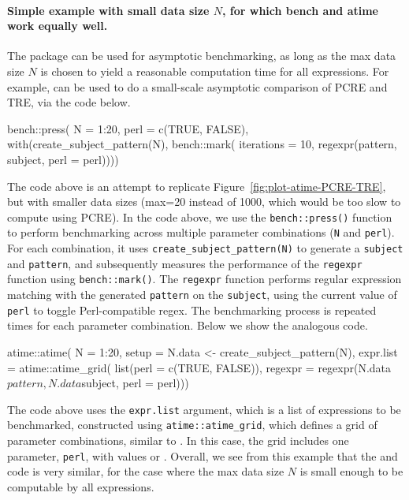 \paragraph{Simple example with small data size $N$, for which bench and atime work equally well.}
The  package can be used for asymptotic benchmarking, as long as the max data size $N$ is chosen to yield a reasonable computation time for all expressions.
For example,  can be used to do a small-scale asymptotic comparison of PCRE and TRE, via the code below. 
\begin{Schunk}
\begin{Sinput}
bench::press(
  N = 1:20,
  perl = c(TRUE, FALSE),
  with(create_subject_pattern(N), bench::mark(
    iterations = 10,
    regexpr(pattern, subject, perl = perl))))
\end{Sinput}
\end{Schunk}
The code above is an attempt to replicate Figure~\ref{fig:plot-atime-PCRE-TRE}, but with smaller data sizes (max=20 instead of 1000, which would be too slow to compute using PCRE).
In the code above, we use the \texttt{bench::press()} function to perform benchmarking across multiple parameter combinations (\texttt{N} and \texttt{perl}).
For each combination, it uses \texttt{create\_subject\_pattern(N)} to generate a \texttt{subject} and \texttt{pattern}, and subsequently measures the performance of the \texttt{regexpr} function using \texttt{bench::mark()}. The \texttt{regexpr} function performs regular expression matching with the generated \texttt{pattern} on the \texttt{subject}, using the current value of \texttt{perl} to toggle Perl-compatible regex. 
The benchmarking process is repeated  times for each parameter combination.
Below we show the analogous  code. 
\begin{Schunk}
\begin{Sinput}
atime::atime(
  N = 1:20,
  setup = N.data <- create_subject_pattern(N),
  expr.list = atime::atime_grid(
    list(perl = c(TRUE, FALSE)),
    regexpr = regexpr(N.data$pattern, N.data$subject, perl = perl)))
\end{Sinput}
\end{Schunk}
The code above uses the \texttt{expr.list} argument, which is a list of expressions to be benchmarked, constructed using \texttt{atime::atime\_grid}, which defines a grid of parameter combinations, similar to . 
In this case, the grid includes one parameter, \texttt{perl}, with values  or . 
Overall, we see from this example that the  and  code is very similar, for the case where the max data size $N$ is small enough to be computable by all expressions.



